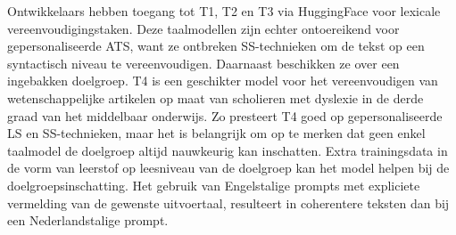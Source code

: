 \medspace

Ontwikkelaars hebben toegang tot T1, T2 en T3 via HuggingFace voor lexicale vereenvoudigingstaken. Deze taalmodellen zijn echter ontoereikend voor gepersonaliseerde ATS, want ze ontbreken SS-technieken om de tekst op een syntactisch niveau te vereenvoudigen. Daarnaast beschikken ze over een ingebakken doelgroep. T4 is een geschikter model voor het vereenvoudigen van wetenschappelijke artikelen op maat van scholieren met dyslexie in de derde graad van het middelbaar onderwijs. Zo presteert T4 goed op gepersonaliseerde LS en SS-technieken, maar het is belangrijk om op te merken dat geen enkel taalmodel de doelgroep altijd nauwkeurig kan inschatten. Extra trainingsdata in de vorm van leerstof op leesniveau van de doelgroep kan het model helpen bij de doelgroepsinschatting. Het gebruik van Engelstalige prompts met expliciete vermelding van de gewenste uitvoertaal, resulteert in coherentere teksten dan bij een Nederlandstalige prompt.